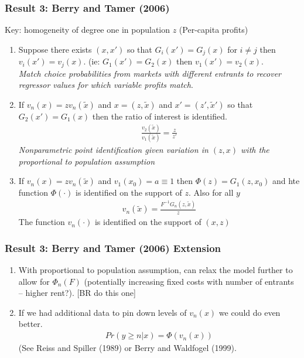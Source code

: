 \documentclass[aspectratio=169,11pt]{beamer}
\begin{document}
\begin{frame}
\frametitle{Result 3: Berry and Tamer (2006)}
\footnotesize
Key: homogeneity of degree one in population $z$ (Per-capita profits)
\begin{enumerate}
\item Suppose there exists $(x,x')$ so that $G_i(x') = G_j(x)$ for $i \neq j$ then $v_i(x') = v_j(x)$. (ie: $G_1(x') = G_2(x)$ then $v_1(x') = v_2(x)$.\\
\textit{Match choice probabilities from markets with different entrants to recover regressor values for which variable profits match}.
\item If $v_n(x) = z v_n(\tilde{x})$ and $x = (z,\tilde{x})$ and $x' = (z',\tilde{x}')$ so that $G_2(x') = G_1(x)$ then the ratio of interest is identified.
\begin{eqnarray*}
\frac{v_2(\tilde{x})} {v_1(\tilde{x})}  = \frac{z}{z'}
\end{eqnarray*}
\textit{Nonparametric point identification given variation in $(z,x)$ with the proportional to population assumption}
\item If $v_n(x) = z v_n(\tilde{x})$ and $v_1(x_0) = a \equiv 1$ then $\Phi(z) = G_1(z,x_0)$ and hte function $\Phi(\cdot)$ is identified on the support of $z$. Also for all $y$ 
\begin{eqnarray*}
v_n(\tilde{x}) = \frac{F^{-1}G_n(z,\tilde{x})}{z}
\end{eqnarray*}
The function $v_n(\cdot)$ is identified on the support of $(x,z)$
\end{enumerate}
\end{frame}

\begin{frame}
\frametitle{Result 3: Berry and Tamer (2006) Extension}
\begin{enumerate}
\item With proportional to population assumption, can relax the model further to allow for $\Phi_n(F)$ (potentially increasing fixed costs with number of entrants -- higher rent?). [BR do this one]
\item If we had additional data to pin down levels of $v_n(x)$ we could do even better.
\begin{eqnarray*}
Pr(y \geq n | x) = \Phi(v_n(x))
\end{eqnarray*}
(See Reiss and Spiller (1989) or Berry and Waldfogel (1999).
\end{enumerate}
\end{frame}
\end{document}
